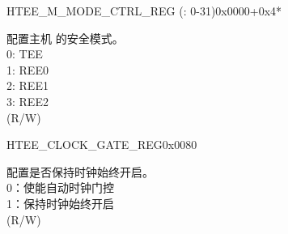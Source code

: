 \begin{register}{H}{TEE\_M\_MODE\_CTRL\_REG (: 0-31)}{0x0000+0x4*}\label{regdesc:TEEM0MODECTRLREG}
%
%
\regnewline%
\begin{regdesc}\begin{reglist}
\label{fielddesc:TEEM0MODE}\item [TEE\_M\regindex{n}\_MODE] 配置主机  的安全模式。\\
0: TEE \\
1: REE0 \\
2: REE1 \\
3: REE2  \\ (R/W)
\end{reglist}\end{regdesc}
\end{register}


































































\begin{register}{H}{TEE\_CLOCK\_GATE\_REG}{0x0080}\label{regdesc:TEECLOCKGATEREG}
%
%
\regnewline%
\begin{regdesc}\begin{reglist}
\label{fielddesc:TEECLKEN}\item [TEE\_CLK\_EN] 配置是否保持时钟始终开启。\\
0：使能自动时钟门控 \\
1：保持时钟始终开启 \\ (R/W)
\end{reglist}\end{regdesc}
\end{register}


